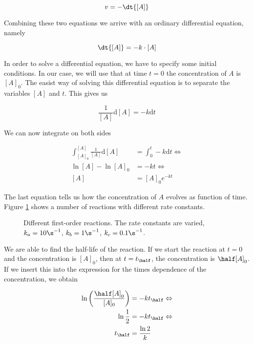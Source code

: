 \begin{equation}
  \label{eq:firstOrderVelocity2}
  v = - \dt{[A]}
\end{equation}

Combining these two equations we arrive with an ordinary differential
equation, namely

\begin{equation}
  \label{eq:firstOrder}
  \dt{[A]} = -k\cdot [A]
\end{equation}

In order to solve a differential equation, we have to specify some
initial conditions. In our case, we will use that at time $t = 0$ the
concentration of $A$ is $[A]_0$. The easist way of solving this
differential equation is to separate the variables \ie $[A]$ and
$t$. This gives us

\begin{equation}
  \label{eq:firstOrderSeparation}
  \frac{1}{[A]}\mathrm{d}[A] = -k\mathrm{d}t
\end{equation}

We can now integrate on both sides \ie

\begin{align}
  \int_{[A]_0}^{[A]} \frac{1}{[A]}\mathrm{d}[A] &= \int_0^t -k\mathrm{d}t \Leftrightarrow  \nonumber \\
  \ln[A] - \ln[A]_0 &= -kt \Leftrightarrow \nonumber \\
  [A] &= [A]_0e^{-kt}
\end{align}

The last equation tells us how the concentration of $A$ evolves as
function of time. Figure \ref{fig:FirstOrderReactions} shows a number
of reactions with different rate constants.

\begin{figure}
  \centering

  \caption{Different first-order reactions. The rate constants are varied, $k_a = 10\s^{-1}$, $k_b = 1\s^{-1}$, $k_c = 0.1\s^{-1}$.}
  \label{fig:FirstOrderReactions}
\end{figure}

We are able to find the half-life of the reaction. If we start the
reaction at $t = 0$ and the concentration is $[A]_0$, then at
$t = t_\half$, the concentration is $\half [A]_0$. If we insert this
into the expression for the times dependence of the concentration, we
obtain

\begin{align}
  \label{eq:firstOrderHalfLives}
  \ln\left(\frac{\half[A]_0}{[A]_0}\right) &= -kt_\half \Leftrightarrow \nonumber \\
  \ln\frac{1}{2} &= -kt_\half \Leftrightarrow \nonumber \\
  t_\half &= \frac{\ln2}{k}
\end{align}

